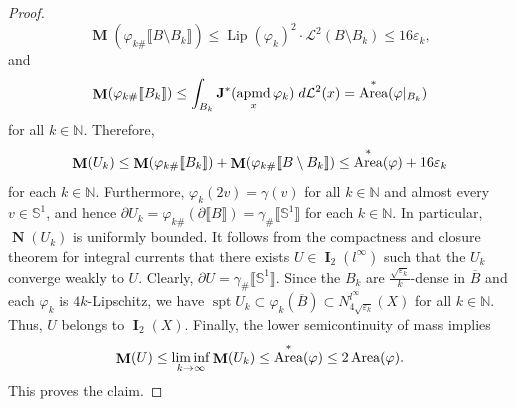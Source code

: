 \documentclass{amsart}
\numberwithin{equation}{section}
\newcommand{\N}{\mathbb{N}}
\newcommand{\leb}{\mathcal{L}}
\newcommand{\spt}{\operatorname{spt}}
\newcommand{\Lip}{\operatorname{Lip}}
\DeclareMathOperator{\bI}{\mathbf{I}}
\DeclareMathOperator{\bM}{\mathbf{M}}
\DeclareMathOperator{\bN}{\mathbf{N}}
\DeclareMathOperator{\area}{\textup{Area}}
\DeclareMathOperator{\apmd}{\operatorname{apmd}}
\newcommand{\bb}[1]{\llbracket #1\rrbracket}
\begin{document}
\begin{proof}
            $$\bM(\varphi_{k\#}\bb{B\setminus B_k}) \leq \Lip(\varphi_k)^2\cdot \leb^2(B\setminus B_k) \leq 16 \varepsilon_k,$$
            and
            $$\bM(\varphi_{k\#}\bb{B_k}) \leq \int_{B_k} \mathbf{J}^*(\apmd_x \varphi_k) \; d\leb^2(x) = \area^*(\varphi|_{B_k})$$
            for all $k \in \N$. Therefore,
            $$\bM(U_k) \leq  \bM(\varphi_{k\#}\bb{B_k}) +\bM(\varphi_{k\#}\bb{B\setminus B_k}) \leq \area^*(\varphi) + 16 \varepsilon_k$$
            for each $k \in \N$. Furthermore, $\varphi_k(2v) = \gamma(v)$ for all $k \in \N$ and almost every $v \in \mathbb{S}^1$, and hence $\partial U_k = \varphi_{k\#}(\partial \bb{B})= \gamma_\#\bb{\mathbb{S}^1}$ for each $k \in \N$. In particular, $\bN(U_k)$ is uniformly bounded. It follows from the compactness and closure theorem for integral currents \cite[Theorem 5.2 and Theorem 8.5]{ambrosio-kirchheim-2000} that there exists $U \in \bI_2(l^\infty)$ such that the $U_k$ converge weakly to $U$. Clearly, $\partial U = \gamma_\#\bb{\mathbb{S}^1}$. Since the $B_k$ are $\frac{\sqrt{\varepsilon_k}}{k}$-dense in $\overline{B}$ and each $\varphi_k$ is $4k$-Lipschitz, we have $\spt U_k \subset \varphi_k(\overline{B}) \subset N_{4\sqrt{\varepsilon_k}}^{l^\infty}(X)$ for all $k\in \N$. Thus, $U$ belongs to $\bI_2(X)$. Finally, the lower semicontinuity of mass implies
            $$\bM(U) \leq \liminf_{k\to \infty} \bM(U_k) \leq \area^*(\varphi)\leq 2 \area(\varphi).$$
            This proves the claim.

            \medskip


\end{proof}
\end{document}
